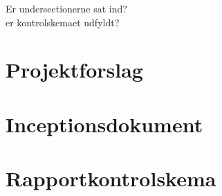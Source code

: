 Er undersectionerne sat ind?\\
er kontrolskemaet udfyldt?
\section{Projektforslag}

\section{Inceptionsdokument}

\section{Rapportkontrolskema}

\begin{center}
\begin{tabular}{| m{3.5cm} | m{10cm} | m{2.5cm} |}


\end{tabular}
\end{center}
